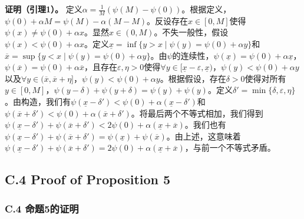 \documentclass[12pt,a4paper]{article}
\newenvironment{translation}
  {\par\noindent{\color{transblue}\ignorespaces}}
  {\par\medskip}
\begin{document}
\begin{translation}
\textbf{证明（引理1）。} 定义$\alpha = \frac{1}{M}(\psi(M) - \psi(0))$。根据定义，$\psi(0) + \alpha M = \psi(M) - \alpha(M - M)$。反设存在$x \in [0, M]$使得$\psi(x) \neq \psi(0) + \alpha x$。显然$x \in (0, M)$。不失一般性，假设$\psi(x) < \psi(0) + \alpha x$。定义$\underline{x} = \inf\{y > x \mid \psi(y) = \psi(0) + \alpha y\}$和$\overline{x} = \sup\{y < x \mid \psi(y) = \psi(0) + \alpha y\}$。由$\psi$的连续性，$\psi(\underline{x}) = \psi(0) + \alpha \underline{x}$，$\psi(\overline{x}) = \psi(0) + \alpha \overline{x}$，且存在$\varepsilon, \eta > 0$使得$\forall y \in [\underline{x} - \varepsilon, \underline{x})$，$\psi(y) < \psi(0) + \alpha y$以及$\forall y \in (\overline{x}, \overline{x} + \eta]$，$\psi(y) < \psi(0) + \alpha y$。根据假设，存在$\delta > 0$使得对所有$y \in [0, M]$，$\psi(y - \delta) + \psi(y + \delta) = \psi(y) + \psi(y)$。定义$\delta' = \min\{\delta, \varepsilon, \eta\}$。由构造，我们有$\psi(\underline{x} - \delta') < \psi(0) + \alpha(\underline{x} - \delta')$和$\psi(\overline{x} + \delta') < \psi(0) + \alpha(\overline{x} + \delta')$。将最后两个不等式相加，我们得到$\psi(\underline{x} - \delta') + \psi(\overline{x} + \delta') < 2\psi(0) + \alpha(\underline{x} + \overline{x})$。我们也有$\psi(\underline{x} - \delta') + \psi(\overline{x} + \delta') = \psi(\underline{x}) + \psi(\overline{x})$。由上述，这意味着$\psi(\underline{x} - \delta') + \psi(\overline{x} + \delta') = 2\psi(0) + \alpha(\underline{x} + \overline{x})$，与前一个不等式矛盾。
\end{translation}

\subsection*{C.4 Proof of Proposition 5}
{\color{transblue}\subsubsection*{C.4 命题5的证明}}
\end{document}
